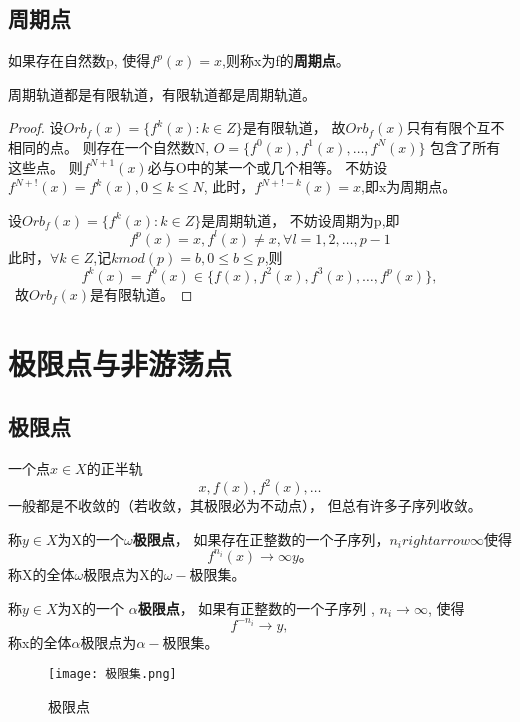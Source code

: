 \subsection{周期点}
如果存在自然数p,
使得\(f^p(x)=x\),则称x为f的\textbf{周期点}。

\begin{thm}
周期轨道都是有限轨道，有限轨道都是周期轨道。
\end{thm}

\begin{proof}
设\(Orb_f(x)=\{f^k(x):k\in Z\}\)是有限轨道，
故\(Orb_f(x)\)只有有限个互不相同的点。
则存在一个自然数N,
\(O=\{f^0(x),f^1(x),\dots,f^N(x)\}\) 包含了所有这些点。
则\(f^{N+1}(x)\)必与O中的某一个或几个相等。
不妨设\(f^{N+!}(x)=f^k(x),0 \leq k \leq N\),
此时，\(f^{N+!-k}(x)=x\),即x为周期点。

设\(Orb_f(x)=\{f^k(x):k\in Z\}\)是周期轨道，
不妨设周期为p,即
\[f^p(x)=x,f^l(x)\neq x ,\forall l=1,2,\dots,p-1\]
此时，\(\forall k \in Z\),记\( k mod(p)=b,0 \leq b \leq p\),则
\[f^k(x)=f^b(x)\in \{f(x),f^2(x),f^3(x),\dots,f^p(x)\},\]\
故\(Orb_f(x)\)是有限轨道。

\end{proof}


\section{极限点与非游荡点}
\subsection{极限点}
一个点\(x \in X\)的正半轨
\[x,f(x),f^2(x),\dots\]
一般都是不收敛的（若收敛，其极限必为不动点），
但总有许多子序列收敛。

\begin{Defination}
称\(y\in X\)为X的一个\textbf{\(\omega\)极限点}，
如果存在正整数的一个子序列，\(n_i rightarrow \infty\)使得
\[f^{n_i}(x) \rightarrow \infty y。\]
称X的全体\(\omega\)极限点为X的\(\omega-\)极限集。
\end{Defination}



\begin{Defination}
称\(y \in X\)为X的一个 \textbf{\(\alpha\)极限点}，
如果有正整数的一个子序列
,
\(n_i \rightarrow \infty\),
使得
\[f^{-n_i} \rightarrow y,\]
称x的全体\(\alpha\)极限点为\(\alpha-\)极限集。
\end{Defination}

\begin{figure}
  \centering
  \texttt{[image: 极限集.png]}\\
  \caption{极限点}\label{}
\end{figure}

